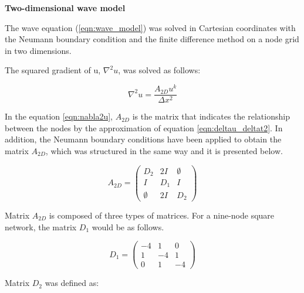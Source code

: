 \documentclass[12pt, a4paper]{article} %
\begin{document}
\setlength{\parindent}{0pt}

\textbf{Two-dimensional wave model}

\normalsize 

\setlength{\parskip}{4mm}

The wave equation (\ref{eqn:wave_model}) was solved in Cartesian coordinates with the Neumann boundary condition and the finite difference method on a node grid in two dimensions. 

\setlength{\parindent}{8pt}

The squared gradient of u, $\nabla^{2}u$, was solved as follows:

\begin{equation} \label{eqn:nabla2u}
 \nabla^{2}u = \frac{A_{2D}u^{k}}{\Delta x^{2}}
\end{equation}

In the equation \ref{eqn:nabla2u}, $A_{2D}$ is the matrix that indicates the relationship between the nodes by the approximation of equation \ref{eqn:deltau_deltat2}. In addition, the Neumann boundary conditions have been applied to obtain the matrix $A_{2D}$, which was structured in the same way and it is presented below.

\begin{equation} \label{eqn:matrixA}
    A_{2D} = 
        \begin{pmatrix}
            D_{2} & 2I & \emptyset\\
            I & D_{1} & I\\
            \emptyset & 2I & D_{2}
    \end{pmatrix}
\end{equation}

Matrix $A_{2D}$ is composed of three types of matrices. For a nine-node square network, the matrix $D_{1}$ would be as follows.

\begin{equation} \label{eqn:matrixD1}
    D_{1} = 
        \begin{pmatrix}
            -4 & 1 & 0\\
            1 & -4 & 1\\
            0 & 1 & -4
    \end{pmatrix}
\end{equation}

Matrix $D_{2}$ was defined as:
\end{document}
